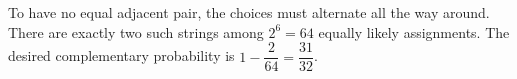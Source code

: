 To have no equal adjacent pair, the choices must alternate all the way around. There are exactly two such strings among $ 2^6=64 $ equally likely assignments. The desired complementary probability is $ 1-\dfrac{2}{64}=\boxed{\dfrac{31}{32}}$.
